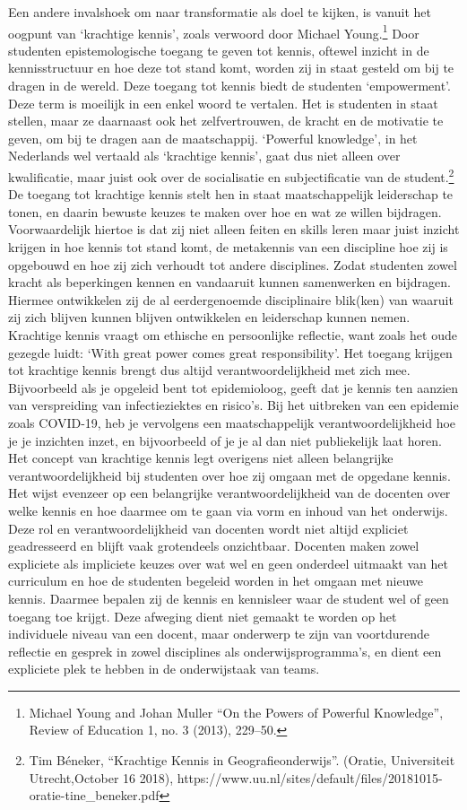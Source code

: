 \documentclass[empirical, authordate, ]{new-jote-article}
\begin{document}
	Een andere invalshoek om naar transformatie als doel te kijken, is vanuit het oogpunt van ‘krachtige kennis', zoals verwoord door Michael Young.\footnote{Michael Young and Johan Muller “On the Powers of Powerful Knowledge”, Review of Education 1, no. 3 (2013), 229--50.} Door studenten epistemologische toegang te geven tot kennis, oftewel inzicht in de kennisstructuur en hoe deze tot stand komt, worden zij in staat gesteld om bij te dragen in de wereld. Deze toegang tot kennis biedt de studenten ‘empowerment'. Deze term is moeilijk in een enkel woord te vertalen. Het is studenten in staat stellen, maar ze daarnaast ook het zelfvertrouwen, de kracht en de motivatie te geven, om bij te dragen aan de maatschappij. ‘Powerful knowledge', in het Nederlands wel vertaald als ‘krachtige kennis', gaat dus niet alleen over kwalificatie, maar juist ook over de socialisatie en subjectificatie van de student.\footnote{Tim Béneker, “Krachtige Kennis in Geografieonderwijs”. (Oratie, Universiteit Utrecht,October 16 2018), https://www.uu.nl/sites/default/files/20181015-oratie-tine\_beneker.pdf} De toegang tot krachtige kennis stelt hen in staat maatschappelijk leiderschap te tonen, en daarin bewuste keuzes te maken over hoe en wat ze willen bijdragen. Voorwaardelijk hiertoe is dat zij niet alleen feiten en skills leren maar juist inzicht krijgen in hoe kennis tot stand komt, de metakennis van een discipline hoe zij is opgebouwd en hoe zij zich verhoudt tot andere disciplines. Zodat studenten zowel kracht als beperkingen kennen en vandaaruit kunnen samenwerken en bijdragen. Hiermee ontwikkelen zij de al eerdergenoemde disciplinaire blik(ken) van waaruit zij zich blijven kunnen blijven ontwikkelen en leiderschap kunnen nemen. Krachtige kennis vraagt om ethische en persoonlijke reflectie, want zoals het oude gezegde luidt: ‘With great power comes great responsibility'. Het toegang krijgen tot krachtige kennis brengt dus altijd verantwoordelijkheid met zich mee. Bijvoorbeeld als je opgeleid bent tot epidemioloog, geeft dat je kennis ten aanzien van verspreiding van infectieziektes en risico's. Bij het uitbreken van een epidemie zoals COVID-19, heb je vervolgens een maatschappelijk verantwoordelijkheid hoe je je inzichten inzet, en bijvoorbeeld of je je al dan niet publiekelijk laat horen. Het concept van krachtige kennis legt overigens niet alleen belangrijke verantwoordelijkheid bij studenten over hoe zij omgaan met de opgedane kennis. Het wijst evenzeer op een belangrijke verantwoordelijkheid van de docenten over welke kennis en hoe daarmee om te gaan via vorm en inhoud van het onderwijs. Deze rol en verantwoordelijkheid van docenten wordt niet altijd expliciet geadresseerd en blijft vaak grotendeels onzichtbaar. Docenten maken zowel expliciete als impliciete keuzes over wat wel en geen onderdeel uitmaakt van het curriculum en hoe de studenten begeleid worden in het omgaan met nieuwe kennis. Daarmee bepalen zij de kennis en kennisleer waar de student wel of geen toegang toe krijgt. Deze afweging dient niet gemaakt te worden op het individuele niveau van een docent, maar onderwerp te zijn van voortdurende reflectie en gesprek in zowel disciplines als onderwijsprogramma's, en dient een expliciete plek te hebben in de onderwijstaak van teams.
\end{document}
